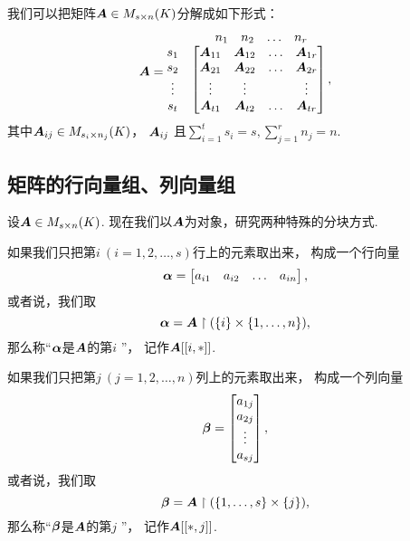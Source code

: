 我们可以把矩阵\(\boldsymbol{A} \in M_{s \times n}(K)\)分解成如下形式：
\begin{equation*}
	\boldsymbol{A}
	= \begin{matrix}
		& \begin{matrix} n_1 & n_2 & \dots & n_r \end{matrix} \\
			\begin{matrix} s_1 \\ s_2 \\ \vdots \\ s_t \end{matrix} & \begin{bmatrix}
			\boldsymbol{A}_{11} & \boldsymbol{A}_{12} & \dots & \boldsymbol{A}_{1r} \\
			\boldsymbol{A}_{21} & \boldsymbol{A}_{22} & \dots & \boldsymbol{A}_{2r} \\
			\vdots & \vdots & & \vdots \\
			\boldsymbol{A}_{t1} & \boldsymbol{A}_{t2} & \dots & \boldsymbol{A}_{tr}
		\end{bmatrix},
	\end{matrix}
\end{equation*}
其中\(\boldsymbol{A}_{ij} \in M_{s_i \times n_j}(K)\)，
\(\boldsymbol{A}_{ij}\)
且\(
	\sum_{i=1}^t s_i = s,
	\sum_{j=1}^r n_j = n
\).

\subsection{矩阵的行向量组、列向量组}
设\(\boldsymbol{A} \in M_{s \times n}(K)\).
现在我们以\(\boldsymbol{A}\)为对象，研究两种特殊的分块方式.

如果我们只把第\(i\ (i=1,2,\dotsc,s)\)行上的元素取出来，
构成一个行向量\begin{equation*}
	\boldsymbol\alpha=\begin{bmatrix}
		a_{i1} & a_{i2} & \dots & a_{in}
	\end{bmatrix},
\end{equation*}
或者说，我们取\begin{equation*}
	\boldsymbol\alpha=\boldsymbol{A}\upharpoonright(\{i\}\times\{1,\dotsc,n\}),
\end{equation*}
那么称“\(\boldsymbol\alpha\)是\(\boldsymbol{A}\)的第\(i\) ”，
记作\(\boldsymbol{A}[[i,*]]\).

如果我们只把第\(j\ (j=1,2,\dotsc,n)\)列上的元素取出来，
构成一个列向量\begin{equation*}
	\boldsymbol\beta=\begin{bmatrix}
		a_{1j} \\ a_{2j} \\ \vdots \\ a_{sj}
	\end{bmatrix},
\end{equation*}
或者说，我们取\begin{equation*}
	\boldsymbol\beta=\boldsymbol{A}\upharpoonright(\{1,\dotsc,s\}\times\{j\}),
\end{equation*}
那么称“\(\boldsymbol\beta\)是\(\boldsymbol{A}\)的第\(j\) ”，
记作\(\boldsymbol{A}[[*,j]]\).

